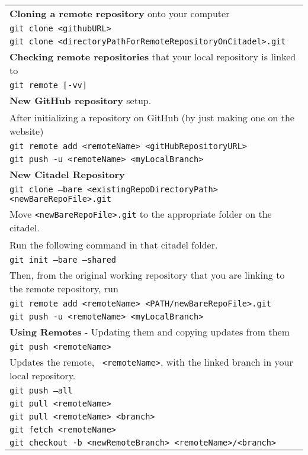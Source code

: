 \documentclass[11pt]{article}
\begin{document}
\begin{tabular}{|l|}
\hline
\textbf{Cloning a remote repository} onto your computer\\
\quad \texttt{git clone <githubURL>}\\

\quad \texttt{git clone <directoryPathForRemoteRepositoryOnCitadel>.git}\\

\hline
\textbf{Checking remote repositories} that your local repository is linked to\\
\quad \texttt{git remote [-vv]}\\

\hline
\textbf{New GitHub repository} setup.\\
After initializing a repository on GitHub (by just making one on the website)\\
\quad \texttt{git remote add <remoteName> <gitHubRepositoryURL>}\\
\quad \texttt{git push -u <remoteName> <myLocalBranch>}\\
\hline
\textbf{New Citadel Repository}\\
\quad \texttt{git clone --bare <existingRepoDirectoryPath> <newBareRepoFile>.git}\\
Move \texttt{<newBareRepoFile>.git} to the appropriate folder on the citadel.\\  
Run the following command in that citadel folder.\\
\quad \texttt{git init --bare --shared}\\
Then, from the original working repository that you are linking to the remote repository, run\\
\quad \texttt{git remote add <remoteName> <PATH/newBareRepoFile>.git}\\
\quad \texttt{git push -u <remoteName> <myLocalBranch>}\\

\hline
\textbf{Using Remotes} - Updating them and copying updates from them\\
\quad \texttt{git push <remoteName>}\\
\quad\quad Updates the remote, \texttt{ <remoteName>}, with the linked branch in your local repository.\\
\quad \texttt{git push --all}\\

\quad \texttt{git pull <remoteName>}\\


\quad \texttt{git pull <remoteName> <branch>}\\



\quad \texttt{git fetch <remoteName>}\\


\quad \texttt{git checkout -b <newRemoteBranch> <remoteName>/<branch>}





\end{tabular}
\end{document}
